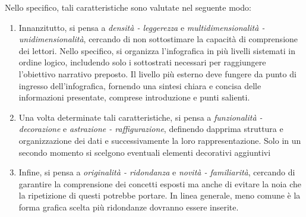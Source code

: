 \bigskip
\noindent Nello specifico, tali caratteristiche sono valutate nel seguente modo:
\begin{enumerate}
    \item Innanzitutto, si pensa a \emph{densità - leggerezza} e \emph{multidimensionalità - unidimensionalità}, cercando di non sottostimare la capacità di comprensione dei lettori.
    Nello specifico, si organizza l'infografica in più livelli sistemati in ordine logico, includendo solo i sottostrati necessari per raggiungere l'obiettivo narrativo preposto.
    Il livello più esterno deve fungere da punto di ingresso dell'infografica, fornendo una sintesi chiara e concisa delle informazioni presentate, comprese introduzione e punti salienti.
    \item Una volta determinate tali caratteristiche, si pensa a \emph{funzionalità - decorazione} e \emph{astrazione - raffigurazione}, definendo dapprima struttura e organizzazione dei dati e successivamente la loro rappresentazione. 
    Solo in un secondo momento si scelgono eventuali elementi decorativi aggiuntivi
    \item Infine, si pensa a \emph{originalità - ridondanza} e \emph{novità - familiarità}, cercando di garantire la comprensione dei concetti esposti ma anche di evitare la noia che la ripetizione di questi potrebbe portare.
    In linea generale, meno comune è la forma grafica scelta più ridondanze dovranno essere inserite.
\end{enumerate}